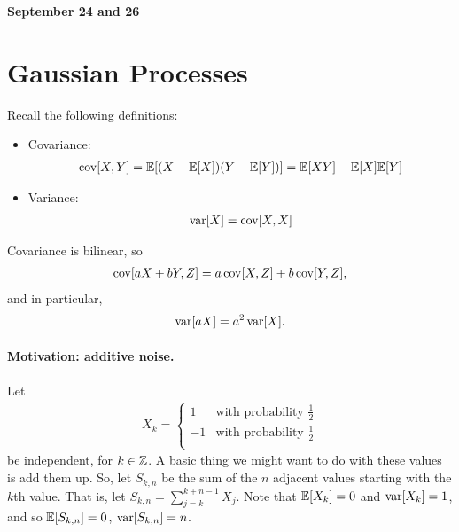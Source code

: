 \documentclass[../../../Master/AppliedStochastics.tex]{subfiles}
\author{Maya}
\date{24 September 2018}
\begin{document}
%


\makelecture


\textbf{\Large September 24 and 26}

\section{Gaussian Processes}

Recall the following definitions:
\begin{itemize}

\item Covariance: 
    $$ \begin{aligned}
        \operatorname{cov}[X,Y]=\mathbb{E}[(X-\mathbb{E}[X])(Y-\mathbb{E}[Y])]=\mathbb{E}[XY]-\mathbb{E}[X]\mathbb{E}[Y]
    \end{aligned}$$

\item Variance: 
    $$\begin{aligned}
        \operatorname{var}[X]=\operatorname{cov}[X,X]
    \end{aligned}$$

\end{itemize}

Covariance is bilinear, so 
$$\begin{aligned}
    \operatorname{cov}[aX+bY,Z]=a\operatorname{cov}[X,Z]+b\operatorname{cov}[Y,Z],
\end{aligned}$$
and in particular, 
$$\begin{aligned}
    \operatorname{var}[aX]=a^2\operatorname{var}[X].
\end{aligned}$$


\paragraph{Motivation: additive noise.}

Let 
$$\begin{aligned}
    X_k=\left\{\begin{array}{cc}
        1 &\text{with probability }\frac{1}{2}\\
        -1 & \text{with probability }\frac{1}{2}\\
      \end{array}\right.
\end{aligned}$$
be independent, for $k\in\mathbb{Z}$.  
A basic thing we might want to do with these values is add them up.  
So, let $S_{k,n}$ be the sum of the $n$ adjacent values starting with the $k$th value.  
That is, let $S_{k,n}=\sum_{j=k}^{k+n-1}X_j$.  
Note that $\mathbb{E}[X_k]=0$ and $\operatorname{var}[X_k]=1$, and so $\mathbb{E}[S_{k,n}]=0$, $\operatorname{var}[S_{k,n}]=n$.
\end{document}
